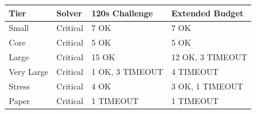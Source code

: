 \begin{tabular}{llll}
\hline
Tier & Solver & 120s Challenge & Extended Budget \\
\hline
Small & Critical & 7 OK & 7 OK \\
Core & Critical & 5 OK & 5 OK \\
Large & Critical & 15 OK & 12 OK, 3 TIMEOUT \\
Very Large & Critical & 1 OK, 3 TIMEOUT & 4 TIMEOUT \\
Stress & Critical & 4 OK & 3 OK, 1 TIMEOUT \\
Paper & Critical & 1 TIMEOUT & 1 TIMEOUT \\
\hline
\end{tabular}
